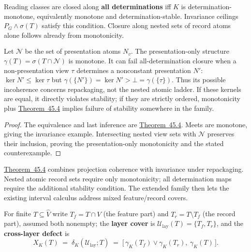 \begin{thmplain}

Reading classes are closed along \textbf{all determinations} iff \(K\) is determination-monotone, equivalently monotone and determination-stable. Invariance ceilings \(P_G\wedge\sigma(T)\) satisfy this condition. Closure along nested sets of record atoms alone follows already from monotonicity.

Let \(\mathcal N\) be the set of presentation atoms \(N_v\). The presentation-only structure \(\gamma(T)=\sigma(T\cap\mathcal N)\) is monotone. It can fail all-determination closure when a non-presentation view \(\tau\) determines a nonconstant presentation \(N'\): \(\ker N'\le\ker\tau\) but \(\gamma(\{N'\})=\ker N'>\bot=\gamma(\{\tau\})\). Thus its possible incoherence concerns repackaging, not the nested atomic ladder. If these kernels are equal, it directly violates stability; if they are strictly ordered, monotonicity plus \hyperlink{stmt:45.4}{Theorem~45.4} implies failure of stability somewhere in the family.
\end{thmplain}

\begin{proof}

The equivalence and last inference are \hyperlink{stmt:45.4}{Theorem~45.4}. Meets are monotone, giving the invariance example. Intersecting nested view sets with \(\mathcal N\) preserves their inclusion, proving the presentation-only monotonicity and the stated counterexample.
\end{proof}

\hyperlink{stmt:45.4}{Theorem~45.4} combines projection coherence with invariance under repackaging. Nested atomic record sets require only monotonicity; all determination maps require the additional stability condition. The extended family then lets the existing interval calculus address mixed feature/record covers.



\begin{thmdef}

For finite \(T \subseteq \widehat{V}\) write \(T_f = T \cap V\) (the feature part) and \(T_r = T \setminus T_f\) (the record part), assumed both nonempty; the \textbf{layer cover} is \(\mathcal{U}_{\mathrm{lay}}(T) = \{T_f, T_r\}\), and the \textbf{cross-layer defect} is
\[
X_K(T) \;=\; \delta_K(\mathcal{U}_{\mathrm{lay}}; T) \;=\; \big[\, \gamma_K(T_f) \vee \gamma_K(T_r),\ \gamma_K(T) \,\big].
\]
\end{thmdef}

